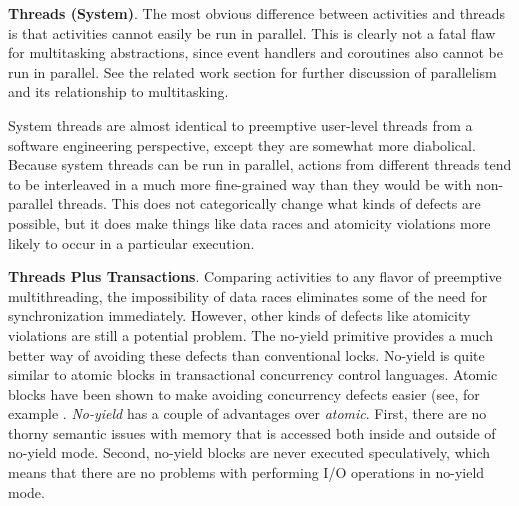 \documentclass[9pt,preprint]{sigplanconf}
\begin{document}
\textbf{Threads (System)}.
The most obvious difference between activities and threads is that activities cannot easily be run in parallel.
This is clearly not a fatal flaw for multitasking abstractions, since event handlers and coroutines also cannot be run in parallel.
See the related work section for further discussion of parallelism and its relationship to multitasking.

System threads are almost identical to preemptive user-level threads from a software engineering perspective, except they are somewhat more diabolical.
Because system threads can be run in parallel, actions from different threads tend to be interleaved in a much more fine-grained way than they would be with non-parallel threads.
This does not categorically change what kinds of defects are possible, but it does make things like data races and atomicity violations more likely to occur in a particular execution.

\textbf{Threads Plus Transactions}.
Comparing activities to any flavor of preemptive multithreading, the impossibility of data races eliminates some of the need for synchronization immediately.
However, other kinds of defects like atomicity violations are still a potential problem.
The no-yield primitive provides a much better way of avoiding these defects than conventional locks.
No-yield is quite similar to atomic blocks in transactional concurrency control languages.
Atomic blocks have been shown to make avoiding concurrency defects easier (see, for example \cite{Harris2005, Grossman2007}.
\emph{No-yield} has a couple of advantages over \emph{atomic}.
First, there are no thorny semantic issues with memory that is accessed both inside and outside of no-yield mode.
Second, no-yield blocks are never executed speculatively, which means that there are no problems with performing I/O operations in no-yield mode.



\end{document}
